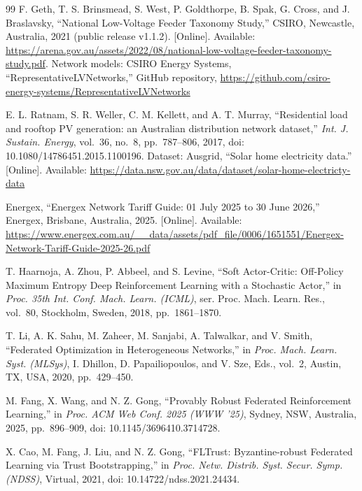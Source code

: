 \documentclass[11pt,a4paper]{article}
\begin{document}
\begin{thebibliography}{99}
 F. Geth, T. S. Brinsmead, S. West, P. Goldthorpe, B. Spak, G. Cross, and J. Braslavsky, ``National Low-Voltage Feeder Taxonomy Study,'' CSIRO, Newcastle, Australia, 2021 (public release v1.1.2). [Online]. Available: \url{https://arena.gov.au/assets/2022/08/national-low-voltage-feeder-taxonomy-study.pdf}. Network models: CSIRO Energy Systems, ``RepresentativeLVNetworks,'' GitHub repository, \url{https://github.com/csiro-energy-systems/RepresentativeLVNetworks}

 E. L. Ratnam, S. R. Weller, C. M. Kellett, and A. T. Murray, ``Residential load and rooftop PV generation: an Australian distribution network dataset,'' \emph{Int. J. Sustain. Energy}, vol.~36, no.~8, pp.~787--806, 2017, doi: 10.1080/14786451.2015.1100196. Dataset: Ausgrid, ``Solar home electricity data.'' [Online]. Available: \url{https://data.nsw.gov.au/data/dataset/solar-home-electricty-data}

 Energex, ``Energex Network Tariff Guide: 01 July 2025 to 30 June 2026,'' Energex, Brisbane, Australia, 2025. [Online]. Available: \url{https://www.energex.com.au/__data/assets/pdf_file/0006/1651551/Energex-Network-Tariff-Guide-2025-26.pdf}

 T. Haarnoja, A. Zhou, P. Abbeel, and S. Levine, ``Soft Actor-Critic: Off-Policy Maximum Entropy Deep Reinforcement Learning with a Stochastic Actor,'' in \emph{Proc. 35th Int. Conf. Mach. Learn. (ICML)}, ser. Proc. Mach. Learn. Res., vol.~80, Stockholm, Sweden, 2018, pp.~1861--1870.

 T. Li, A. K. Sahu, M. Zaheer, M. Sanjabi, A. Talwalkar, and V. Smith, ``Federated Optimization in Heterogeneous Networks,'' in \emph{Proc. Mach. Learn. Syst. (MLSys)}, I. Dhillon, D. Papailiopoulos, and V. Sze, Eds., vol.~2, Austin, TX, USA, 2020, pp.~429--450.

 M. Fang, X. Wang, and N. Z. Gong, ``Provably Robust Federated Reinforcement Learning,'' in \emph{Proc. ACM Web Conf. 2025 (WWW '25)}, Sydney, NSW, Australia, 2025, pp.~896--909, doi: 10.1145/3696410.3714728.

 X. Cao, M. Fang, J. Liu, and N. Z. Gong, ``FLTrust: Byzantine-robust Federated Learning via Trust Bootstrapping,'' in \emph{Proc. Netw. Distrib. Syst. Secur. Symp. (NDSS)}, Virtual, 2021, doi: 10.14722/ndss.2021.24434.

\end{thebibliography}
\end{document}
